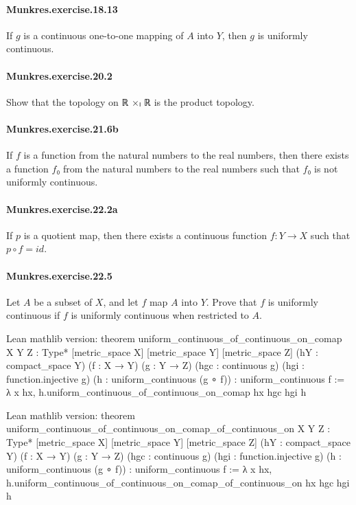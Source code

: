 \documentclass{article}
\begin{document}
\paragraph{Munkres.exercise.18.13} If $g$ is a continuous one-to-one mapping of $A$ into $Y$, then $g$ is uniformly continuous.

\paragraph{Munkres.exercise.20.2} Show that the topology on ℝ ×ₗ ℝ is the product topology.

\paragraph{Munkres.exercise.21.6b} If $f$ is a function from the natural numbers to the real numbers, then there exists a function $f₀$ from the natural numbers to the real numbers such that $f₀$ is not uniformly continuous.

\paragraph{Munkres.exercise.22.2a} If $p$ is a quotient map, then there exists a continuous function $f : Y → X$ such that $p ∘ f = id$.

\paragraph{Munkres.exercise.22.5} Let $A$ be a subset of $X$, and let $f$ map $A$ into $Y$. Prove that $f$ is uniformly continuous if $f$ is uniformly continuous when restricted to $A$.

Lean mathlib version:
theorem uniform_continuous_of_continuous_on_comap {X Y Z : Type*} [metric_space X] [metric_space Y] [metric_space Z]
  (hY : compact_space Y) (f : X → Y) (g : Y → Z) (hgc : continuous g)
  (hgi : function.injective g)
  (h : uniform_continuous (g ∘ f)) : uniform_continuous f :=
λ x hx, h.uniform_continuous_of_continuous_on_comap hx hgc hgi h

Lean mathlib version:
theorem uniform_continuous_of_continuous_on_comap_of_continuous_on {X Y Z : Type*} [metric_space X] [metric_space Y] [metric_space Z]
  (hY : compact_space Y) (f : X → Y) (g : Y → Z) (hgc : continuous g)
  (hgi : function.injective g)
  (h : uniform_continuous (g ∘ f)) : uniform_continuous f :=
λ x hx, h.uniform_continuous_of_continuous_on_comap_of_continuous_on hx hgc hgi h
\end{document}
